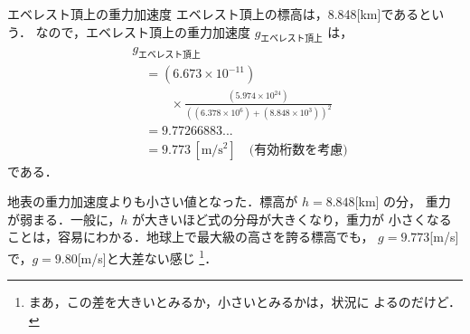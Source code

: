             \begin{memo}{エベレスト頂上の重力加速度}
                エベレスト頂上の標高は，8.848[km]であるという．
                なので，エベレスト頂上の重力加速度 ${g}_{\mbox{エベレスト頂上}}$ は，
                \begin{align*}
                    \mbox{}
                    &{g}_{\mbox{エベレスト頂上}} \\
                    &\quad = (6.673 \times 10^{-11}) \\
                    &\quad \quad \quad \times
                        \frac{(5.974 \times 10^{24})}
                             {{( (6.378 \times 10^{6}) + (8.848 \times 10^{3}) ) }^{2}} \\
                    &\quad = 9.77266883...  \\
                    &\quad = 9.773 \,\mathrm{[m/s^{2}]} \quad \mbox{(有効桁数を考慮)}
                \end{align*}
                である．

                地表の重力加速度よりも小さい値となった．標高が $h=8.848$[km] の分，
                重力が弱まる．一般に，$h$ が大きいほど式の分母が大きくなり，重力が
                小さくなることは，容易にわかる．地球上で最大級の高さを誇る標高でも，
                $g=9.773$[m/s] で，$g=9.80$[m/s]と大差ない感じ
                    \footnote{
                        まあ，この差を大きいとみるか，小さいとみるかは，状況に
                        よるのだけど．
                    }．
            \end{memo}



